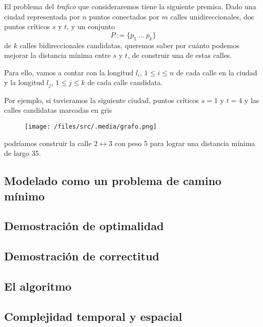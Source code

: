 El problema del \textit{trafico} que consideraremos tiene la siguiente premisa. Dado una ciudad representada por $n$ puntos conectados por $m$ calles unidireccionales, dos puntos críticos $s$ y $t$, y un conjunto
\begin{equation*}
    P := \{p_1 \ ... \ p_k\}    
\end{equation*}
de $k$ calles bidireccionales candidatas, queremos saber por cuánto podemos mejorar la distancia mínima entre $s$ y $t$, de construir una de estas calles.

Para ello, vamos a contar con la longitud $l_i$, $1 \leq i \leq n$ de cada calle en la ciudad y la longitud $l_j$, $1 \leq j \leq k$ de cada calle candidata.

Por ejemplo, si tuvieramos la siguiente ciudad, puntos críticos $s = 1$ y $t = 4$ y las calles candidatas marcadas en gris
\begin{figure}[!htbp]
    \texttt{[image: /files/src/.media/grafo.png]} 
\end{figure}
    
\noindent podríamos construir la calle $2 \leftrightarrow 3$ con peso $5$ para lograr una distancia mínima de largo $35$.

\subsection{Modelado como un problema de camino mínimo}\label{modelo}

\subsection{Demostración de optimalidad}

\subsection{Demostración de correctitud}\label{correctitud} 

\subsection{El algoritmo} 

\subsection{Complejidad temporal y espacial} 
